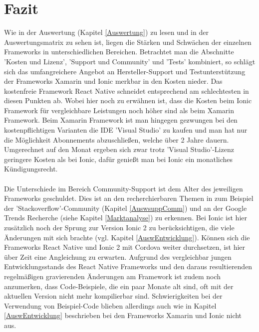 \chapter{Fazit}

Wie in der Auswertung (Kapitel \ref{Auswertung}) zu lesen und in der Auswertungsmatrix zu sehen ist, liegen die Stärken und Schwächen der einzelnen Frameworks in unterschiedlichen Bereichen. Betrachtet man die Abschnitte 'Kosten und Lizenz', 'Support und Community' und 'Tests' kombiniert, so schlägt sich das umfangreichere Angebot an Hersteller-Support und Testunterstützung der Frameworks Xamarin und Ionic merkbar in den Kosten nieder. Das kostenfreie Framework React Native schneidet entsprechend am schlechtesten in diesen Punkten ab. Wobei hier noch zu erwähnen ist, dass die Kosten beim Ionic Framework für vergleichbare Leistungen noch höher sind als beim Xamarin Framework. Beim Xamarin Framework ist man hingegen gezwungen bei den kostenpflichtigen Varianten die IDE 'Visual Studio' zu kaufen und man hat nur die Möglichkeit Abonnements abzuschließen, welche über 2 Jahre dauern. Umgerechnet auf den Monat ergeben sich zwar trotz 'Visual Studio'-Lizenz geringere Kosten als bei Ionic, dafür genießt man bei Ionic ein monatliches Kündigungsrecht. 
\\
\\
Die Unterschiede im Bereich Community-Support ist dem Alter des jeweiligen Frameworks geschuldet. Dies ist an den recherchierbaren Themen in zum Beispiel der 'Stackoverflow'-Community (Kapitel \ref{AuswsuppComm}) und an der Google Trends Recherche (siehe Kapitel \ref{Marktanalyse}) zu erkennen. Bei Ionic ist hier zusätzlich noch der Sprung zur Version Ionic 2 zu berücksichtigen, die viele Änderungen mit sich brachte (vgl. Kapitel \ref{AuswEntwicklung}). Können sich die Frameworks React Native und Ionic 2 mit Cordova weiter durchsetzen, ist hier über Zeit eine Angleichung zu erwarten. Aufgrund des vergleichbar jungen Entwicklungsstands des React Native Frameworks und den daraus resultierenden regelmäßigen gravierenden Änderungen am Framework ist zudem noch anzumerken, dass Code-Beispiele, die ein paar Monate alt sind, oft mit der aktuellen Version nicht mehr kompilierbar sind. Schwierigkeiten bei der Verwendung von Beispiel-Code blieben allerdings auch wie in Kapitel \ref{AuswEntwicklung} beschrieben bei den Frameworks Xamarin und Ionic nicht aus.
\\
\\
